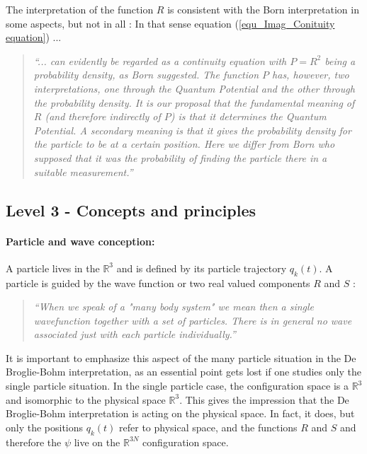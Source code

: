 \documentclass{article}
\begin{document}
The interpretation of the function $R$ is consistent with the Born interpretation in some aspects, but not in all \cite[p.325]{bohm1987ontological}: In that sense equation (\ref{equ_Imag_Conituity equation}) ...

\begin{quote}
\textit{``... can evidently be regarded as a continuity equation with $P = R^2$ being a probability density, as Born suggested. The function $P$ has, however, two interpretations, one through the Quantum Potential and the other through the probability density. It is our proposal that the fundamental meaning of $R$ (and therefore indirectly of $P$) is that it determines the Quantum Potential. A secondary meaning is that it gives the probability density for the particle to be at a certain position. Here we differ from Born who supposed that it was the probability of finding the particle there in a suitable measurement.''}
\end{quote}

\subsection*{Level 3 - Concepts and principles}

\paragraph{Particle and wave conception:}

A particle lives in the $\mathbb{R}^3$ and is defined by its particle trajectory $q_k(t)$. A particle is guided by the wave function or  two real valued components $R$ and $S$ \cite[p.277]{holland1995quantum}:

\begin{quote}
\textit{``When we speak of a "many body system" we mean then a single wavefunction together with a set of particles. There is in general no wave associated just with each particle individually.''}
\end{quote}

It is important to emphasize this aspect of the many particle situation in the De Broglie-Bohm interpretation, as an essential point gets lost if one studies only the single particle situation. In the single particle case, the configuration space is a $\mathbb{R}^3$ and isomorphic to the physical space $\mathbb{R}^3$. This gives the impression that the De Broglie-Bohm interpretation is acting on the physical space. In fact, it does, but only the positions $q_k(t)$ refer to physical space, and the functions $R$ and $S$ and therefore the $\psi$ live on the $\mathbb{R}^{3N}$ configuration space. 
\end{document}
